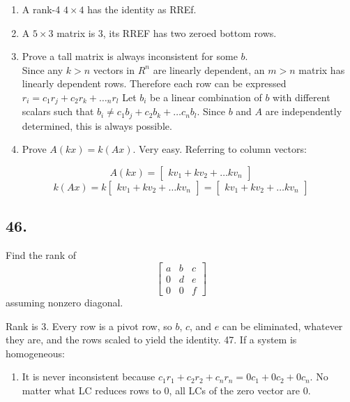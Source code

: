 \documentclass[]{article}
\providecommand{\tightlist}{%
  \setlength{\itemsep}{0pt}\setlength{\parskip}{0pt}}
\begin{document}
\begin{enumerate}
\def\labelenumi{\arabic{enumi}.}
\setcounter{enumi}{26}
\item
  A rank-4 \(4\times{4}\) has the identity as RREf.
\item
  A \(5\times{3}\) matrix is 3, its RREF has two zeroed bottom rows.
\item
  Prove a tall matrix is always inconsistent for some \(b\).\\
  Since any \(k>n\) vectors in \(R^n\) are linearly dependent, an
  \(m >n\) matrix has linearly dependent rows. Therefore each row can be
  expressed \(r_i=c_1r_j+c_2r_k+\dotsc_nr_l\) Let \(b_i\) be a linear
  combination of \(b\) with different scalars such that
  \(b_i\neq{c_1}b_j+c_2b_k+\dots{c_n}b_l\). Since \(b\) and \(A\) are
  independently determined, this is always possible.
\item
  Prove \(A(kx) = k(Ax)\). Very easy. Referring to column vectors:
\end{enumerate}

\[A(kx) = \begin{bmatrix}kv_1+kv_2+\dots kv_n\end{bmatrix}\]
\[k(Ax) = k\begin{bmatrix}kv_1+kv_2+\dots kv_n\end{bmatrix}=
\begin{bmatrix}kv_1+kv_2+\dots kv_n\end{bmatrix}\]

\hypertarget{section-22}{%
\subsection{46.}\label{section-22}}

Find the rank of \[\begin{bmatrix}a&b&c\\
0&d&e\\
0&0&f\end{bmatrix}\] assuming nonzero diagonal.

Rank is 3. Every row is a pivot row, so \(b\), \(c\), and \(e\) can be
eliminated, whatever they are, and the rows scaled to yield the
identity. 47. If a system is homogeneous:

\begin{enumerate}
\def\labelenumi{\arabic{enumi}.}
\tightlist
\item
  It is never inconsistent because
  \(c_1r_1+c_2r_2+c_nr_n=0c_1+0c_2+0c_n\). No matter what LC reduces
  rows to 0, all LCs of the zero vector are 0.
\end{enumerate}
\end{document}
